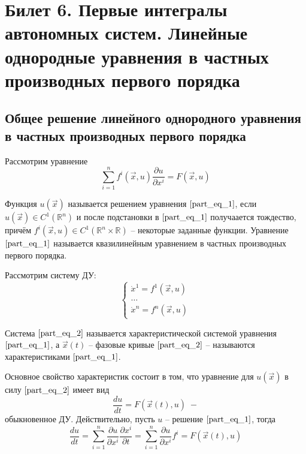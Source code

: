 \documentclass[a4paper, 12pt]{article}
\begin{document}
    \section{Билет 6. Первые интегралы автономных систем. Линейные однородные уравнения в частных производных первого порядка}
    \subsection{Общее решение линейного однородного уравнения в частных производных первого порядка}

    \begin{definition}
        Рассмотрим уравнение 
        \begin{equation}
            \sum \limits_{i = 1}^{n} f^{i} (\overrightarrow{x}, u) \frac{\partial u}{\partial x^{i}} = F(\overrightarrow{x}, u)
            \label{part_eq_1}
        \end{equation}

        Функция $u(\overrightarrow{x})$ называется решением уравнения $\ref{part_eq_1}$, если $u(\overrightarrow{x}) \in C^{1}(\mathbb{R}^n)$ и после подстановки в $\ref{part_eq_1}$ получаается тождество, причём $f^{i} (\overrightarrow{x}, u) \in C^{1}(\mathbb{R}^n \times \mathbb{R})$ -- некоторые заданные функции. Уравнение $\ref{part_eq_1}$ называется квазилинейным уравнением в частных производных первого порядка. 
    \end{definition}
    
    \begin{definition}
        Рассмотрим систему ДУ:
        \begin{equation}
            \begin{cases}
                \dot{x}^1 = f^1(\overrightarrow{x}, u) \\
                \dots                                  \\
                \dot{x}^n = f^n(\overrightarrow{x}, u)
            \end{cases}
            \label{part_eq_2}
        \end{equation}
    
        Система $\ref{part_eq_2}$ называется характеристической системой уравнения $\ref{part_eq_1}$, а $\overrightarrow{x}(t)$ -- фазовые кривые $\ref{part_eq_2}$ -- называются характеристиками $\ref{part_eq_1}$.
    \end{definition}
   
    Основное свойство характеристик состоит в том, что уравнение для $u(\overrightarrow{x})$ в силу $\ref{part_eq_2}$ имеет вид 
    \begin{equation*}
        \frac{du}{dt} = F(\overrightarrow{x}(t), u) \; -
    \end{equation*}
    обыкновенное ДУ. Действительно, пусть $u$ -- решение $\ref{part_eq_1}$, тогда 
    \begin{equation*}
        \frac{du}{dt} =  \sum \limits_{i = 1}^{n} \frac{\partial u}{\partial x^i} \frac{\partial x^i}{\partial t} = \sum \limits_{i = 1}^{n} \frac{\partial u}{\partial x^i} f^i = F(\overrightarrow{x}(t), u)
    \end{equation*}
\end{document}
